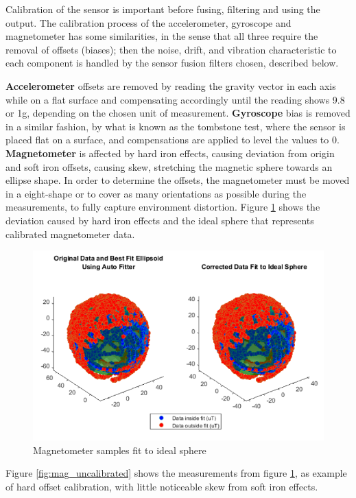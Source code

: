 Calibration of the sensor is important before fusing, filtering and using the output. The calibration process of the accelerometer, gyroscope and magnetometer has some similarities, in the sense that all three require the removal of offsets (biases); then the noise, drift, and vibration characteristic to each component is handled by the sensor fusion filters chosen, described below. 

\textbf{Accelerometer} offsets are removed by reading the gravity vector in each axis while on a flat surface and compensating accordingly until the reading shows 9.8 or 1g, depending on the chosen unit of measurement. \textbf{Gyroscope} bias is removed in a similar fashion, by what is known as the tombstone test, where the sensor is placed flat on a surface, and compensations are applied to level the values to 0. \textbf{Magnetometer} is affected by hard iron effects, causing deviation from origin and soft iron offsets, causing skew, stretching the magnetic sphere towards an ellipse shape. In order to determine the offsets, the magnetometer must be moved in a eight-shape or to cover as many orientations as possible during the measurements, to fully capture environment distortion. Figure \ref{fig:Magnetometer} shows the deviation caused by hard iron effects and the ideal sphere that represents calibrated magnetometer data. 
 
 \begin{figure}[H]
  \centering
  \includegraphics[scale=0.7]{graphics/mag.png}
  \caption{Magnetometer samples fit to ideal sphere}
  \label{fig:Magnetometer}
\end{figure}
 
 Figure \ref{fig:mag_uncalibrated} shows the measurements from figure \ref{fig:Magnetometer}, as example of hard offset calibration, with  little noticeable skew from soft iron effects. 
  
